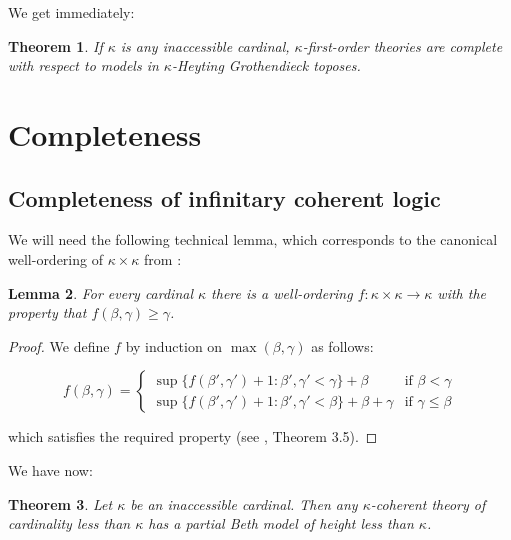 \documentclass[a4paper,11pt]{article}
\theoremstyle{plain}
\newtheorem{thm}{Theorem}[subsection]
\newtheorem{lemma}[thm]{Lemma}
\theoremstyle{plain}
\theoremstyle{remark}
\begin{document}
We get immediately:

\begin{thm}
 If $\kappa$ is any inaccessible cardinal, $\kappa$-first-order theories are complete with respect to models in $\kappa$-Heyting Grothendieck toposes. 
\end{thm}

\section{Completeness}

\subsection{Completeness of infinitary coherent logic}


We will need the following technical lemma, which corresponds to the canonical well-ordering of $\kappa \times \kappa$ from \cite{jechst}:

\begin{lemma}\label{dwo}
 For every cardinal $\kappa$ there is a well-ordering $f: \kappa \times \kappa \to \kappa$ with the property that $f(\beta, \gamma) \geq \gamma$.
\end{lemma}

\begin{proof}
 We define $f$ by induction on $\max (\beta, \gamma)$ as follows:
 
 $$f(\beta, \gamma)=\begin{cases} \sup\{f(\beta', \gamma')+1: \beta', \gamma'<\gamma\}+\beta  & \mbox{if }  \beta<\gamma  \\ \sup\{f(\beta', \gamma')+1: \beta', \gamma'<\beta\}+\beta+\gamma & \mbox{if } \gamma \leq \beta \end{cases}$$
 
\noindent which satisfies the required property (see \cite{jechst}, Theorem 3.5).
\end{proof}

We have now:

\begin{thm}\label{shcomp}
 Let $\kappa$ be an inaccessible cardinal. Then any $\kappa$-coherent theory of cardinality less than $\kappa$ has a partial Beth model of height less than $\kappa$.
\end{thm}
\end{document}
